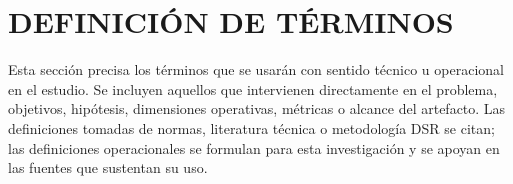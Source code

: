 \documentclass[11pt,a4paper,oneside]{report}
\begin{document}
\section{DEFINICIÓN DE TÉRMINOS}
\label{sec:definicion-terminos}

Esta sección precisa los términos que se usarán con sentido técnico u operacional en el estudio. Se incluyen aquellos que intervienen directamente en el problema, objetivos, hipótesis, dimensiones operativas, métricas o alcance del artefacto. Las definiciones tomadas de normas, literatura técnica o metodología DSR se citan; las definiciones operacionales se formulan para esta investigación y se apoyan en las fuentes que sustentan su uso.

\begingroup
{}
\renewcommand*\descriptionlabel[1]{\refstepcounter{terminodefinicion}\normalfont\bfseries\thesection.\theterminodefinicion. #1}
\end{document}
